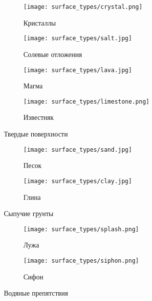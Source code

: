 \begin{figure}[H]
\begin{subfigure}{0.49\textwidth}
\centering\texttt{[image: surface\_types/crystal.png]}\\
\caption{Кристаллы}
\label{fig:crystal}
\end{subfigure}
\begin{subfigure}{0.49\textwidth}
\centering\texttt{[image: surface\_types/salt.jpg]}\\
\caption{Солевые отложения}
\label{fig:salt}
\end{subfigure}

\begin{subfigure}{0.49\textwidth}
\centering\texttt{[image: surface\_types/lava.jpg]}\\
\caption{Магма}
\label{fig:lava}
\end{subfigure}
\begin{subfigure}{0.49\textwidth}
\centering\texttt{[image: surface\_types/limestone.png]}\\
\caption{Известняк}
\label{fig:limestone}
\end{subfigure}
\caption{Твердые поверхности}
\label{fig:solid_surfaces}
\end{figure}

\begin{figure}[H]
\begin{subfigure}{0.49\textwidth}
\centering\texttt{[image: surface\_types/sand.jpg]}\\
\caption{Песок}
\label{fig:sand}
\end{subfigure}
\begin{subfigure}{0.49\textwidth}
\centering\texttt{[image: surface\_types/clay.jpg]}\\
\caption{Глина}
\label{fig:clay}
\end{subfigure}
\caption{Сыпучие грунты}
\label{fig:running_soils}
\end{figure}

\begin{figure}[H]
\begin{subfigure}{0.49\textwidth}
\centering\texttt{[image: surface\_types/splash.png]}\\
\caption{Лужа}
\label{fig:splash}
\end{subfigure}
\begin{subfigure}{0.49\textwidth}
\centering\texttt{[image: surface\_types/siphon.png]}\\
\caption{Сифон}
\label{fig:siphon}
\end{subfigure}
\caption{Водяные препятствия}
\label{fig:water_obstacles}
\end{figure}

